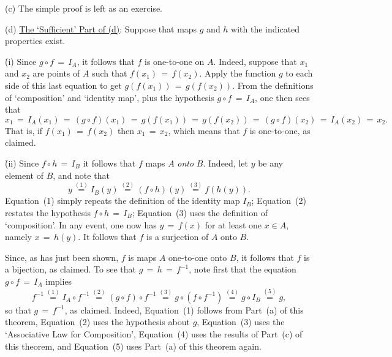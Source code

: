 \V


        (c) The simple proof is left as an exercise.

\V

        (d) \underline{The `Sufficient' Part of (d)}: Suppose that maps $g$ and $h$ with the indicated properties exist.

       \h (i) Since $g{\circ}f \,=\, I_{A}$, it follows that $f$ is one-to-one on $A$.
    Indeed, suppose that $x_{1}$ and $x_{2}$ are points of $A$ such that $f(x_{1}) \,=\, f(x_{2})$.
	Apply the function $g$ to each side of this last equation to get $g(f(x_{1})) \,=\, g(f(x_{2}))$.
    From the definitions of `composition' and `identity map',  plus the hypothesis $g{\circ}f \,=\, I_{A}$, one then sees that
        \begin{displaymath}
        x_{1} \,=\, I_{A}(x_{1}) \,=\, (g{\circ}f)(x_{1}) \,=\, g(f(x_{1})) \,=\, g(f(x_{2})) \,=\, (g{\circ}f)(x_{2}) \,=\, I_{A}(x_{2}) \,=\, x_{2}.
        \end{displaymath}
    That is, if $f(x_{1}) \,=\, f(x_{2})$ then $x_{1} \,=\, x_{2}$, which means that $f$ is one-to-one, as claimed.

        \h (ii) Since $f{\circ}h \,=\, I_{B}$ it follows that $f$ maps $A$ {\em onto} $B$.
    Indeed, let $y$ be any element of $B$, and note that
        \begin{displaymath}
        y \stackrel{(1)}{ \,=\, } I_{B}(y) \stackrel{(2)}{ \,=\, } (f{\circ}h)(y) \stackrel{(3)}{ \,=\, } 
    f(h(y)).
        \end{displaymath}
    Equation~(1) simply repeats the definition of the identity map $I_{B}$; Equation~(2) restates the hypothesis $f{\circ}h \,=\, I_{B}$;
    Equation~(3) uses the definition of `composition'.
    In any event, one now has $y \,=\, f(x)$ for at least one $x{\in}A$, namely $x \,=\, h(y)$.
    It follows that $f$ is a surjection of $A$ onto $B$.%

        Since, as has just been shown, $f$ is maps $A$ one-to-one onto $B$, it follows that $f$ is a bijection, as claimed.
    To see that $g \,=\, h \,=\, f^{-1}$,
 note first that the equation $g{\circ}f \,=\, I_{A}$ implies
        \begin{displaymath}
        f^{-1} \stackrel{(1)}{ \,=\, }  I_{A}{\circ}f^{-1} \stackrel{(2)}{ \,=\, } 
    (g{\circ}f){\circ}f^{-1} \stackrel{(3)}{ \,=\, } 
    g{\circ}(f{\circ}f^{-1}) \stackrel{(4)}{ \,=\, } 
    g{\circ}I_{B} \stackrel{(5)}{ \,=\, } 
    g,
        \end{displaymath}
    so that $g \,=\, f^{-1}$, as claimed.
    Indeed, Equation~(1) follows from Part~(a) of this theorem, Equation~(2) uses the hypothesis about $g$, Equation~(3) uses the `Associative Law for Composition',
    Equation~(4) uses the results of Part~(c) of this theorem, and Equation~(5) uses Part~(a) of this theorem again.

